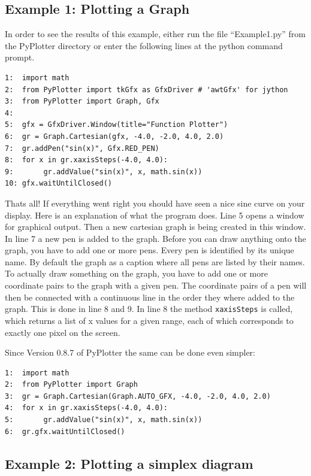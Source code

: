 \documentclass[12pt,a4paper,USenglish]{article}
\begin{document}
\subsection{Example 1: Plotting a Graph}

In order to see the results of this example, either run the file
``Example1.py'' from the {\sf PyPlotter} directory or enter the following
lines at the python command prompt.

\begin{verbatim}
1:  import math
2:  from PyPlotter import tkGfx as GfxDriver # 'awtGfx' for jython
3:  from PyPlotter import Graph, Gfx
4:    
5:  gfx = GfxDriver.Window(title="Function Plotter")   
6:  gr = Graph.Cartesian(gfx, -4.0, -2.0, 4.0, 2.0)    
7:  gr.addPen("sin(x)", Gfx.RED_PEN)
8:  for x in gr.xaxisSteps(-4.0, 4.0):
9:       gr.addValue("sin(x)", x, math.sin(x))
10: gfx.waitUntilClosed()
\end{verbatim}

Thats all! If everything went right you should have seen a nice sine
curve on your display. Here is an explanation of what the program
does. Line 5 opens a window for graphical output. Then a new cartesian
graph is being created in this window. In line 7 a new pen is added to
the graph. Before you can draw anything onto the graph, you have to
add one or more pens. Every pen is identified by its unique name. By
default the graph as a caption where all pens are listed by their
names. To actually draw something on the graph, you have to add one or
more coordinate pairs to the graph with a given pen. The coordinate
pairs of a pen will then be connected with a continuous line in the
order they where added to the graph. This is done in line 8 and 9.  In
line 8 the method {\tt xaxisSteps} is called, which returns a list of
x values for a given range, each of which corresponds to exactly one
pixel on the screen.

Since Version 0.8.7 of PyPlotter the same can be done even simpler:

\begin{verbatim}
1:  import math
2:  from PyPlotter import Graph 
3:  gr = Graph.Cartesian(Graph.AUTO_GFX, -4.0, -2.0, 4.0, 2.0)    
4:  for x in gr.xaxisSteps(-4.0, 4.0):
5:       gr.addValue("sin(x)", x, math.sin(x))
6:  gr.gfx.waitUntilClosed()
\end{verbatim}


\subsection{Example 2: Plotting a simplex diagram}
\end{document}
